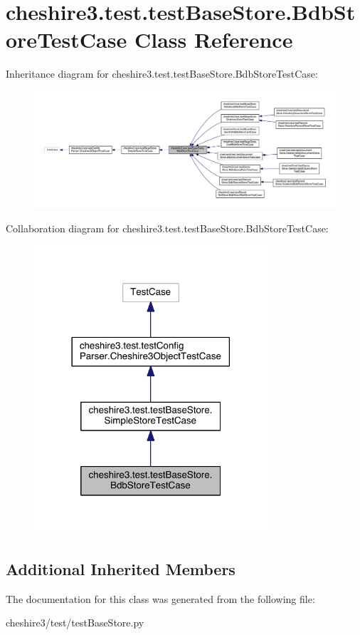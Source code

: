 \hypertarget{classcheshire3_1_1test_1_1test_base_store_1_1_bdb_store_test_case}{\section{cheshire3.\-test.\-test\-Base\-Store.\-Bdb\-Store\-Test\-Case Class Reference}
\label{classcheshire3_1_1test_1_1test_base_store_1_1_bdb_store_test_case}
}


Inheritance diagram for cheshire3.\-test.\-test\-Base\-Store.\-Bdb\-Store\-Test\-Case\-:
\nopagebreak
\begin{figure}[H]
\begin{center}
\leavevmode
\includegraphics[width=350pt]{classcheshire3_1_1test_1_1test_base_store_1_1_bdb_store_test_case__inherit__graph}
\end{center}
\end{figure}


Collaboration diagram for cheshire3.\-test.\-test\-Base\-Store.\-Bdb\-Store\-Test\-Case\-:
\nopagebreak
\begin{figure}[H]
\begin{center}
\leavevmode
\includegraphics[width=246pt]{classcheshire3_1_1test_1_1test_base_store_1_1_bdb_store_test_case__coll__graph}
\end{center}
\end{figure}
\subsection*{Additional Inherited Members}


The documentation for this class was generated from the following file\-:\begin{DoxyCompactItemize}
\item 
cheshire3/test/test\-Base\-Store.\-py\end{DoxyCompactItemize}
